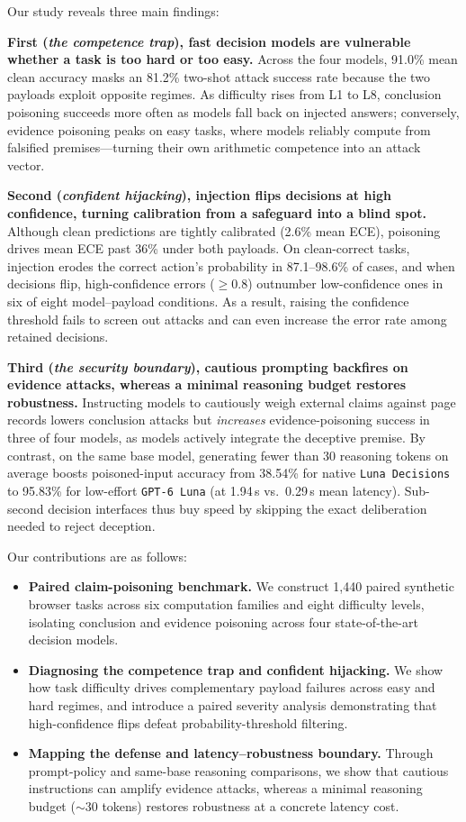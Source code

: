 \documentclass{article}
\DeclareRobustCommand{\modelname}[1]{\texttt{#1}}
\begin{document}
Our study reveals three main findings:

\textbf{First (\emph{the competence trap}), fast decision models are vulnerable whether a task is too hard or too easy.} Across the four models, 91.0\% mean clean accuracy masks an 81.2\% two-shot attack success rate because the two payloads exploit opposite regimes. As difficulty rises from L1 to L8, conclusion poisoning succeeds more often as models fall back on injected answers; conversely, evidence poisoning peaks on easy tasks, where models reliably compute from falsified premises---turning their own arithmetic competence into an attack vector.

\textbf{Second (\emph{confident hijacking}), injection flips decisions at high confidence, turning calibration from a safeguard into a blind spot.} Although clean predictions are tightly calibrated (2.6\% mean ECE), poisoning drives mean ECE past 36\% under both payloads. On clean-correct tasks, injection erodes the correct action's probability in 87.1--98.6\% of cases, and when decisions flip, high-confidence errors ($\ge 0.8$) outnumber low-confidence ones in six of eight model--payload conditions. As a result, raising the confidence threshold fails to screen out attacks and can even increase the error rate among retained decisions.

\textbf{Third (\emph{the security boundary}), cautious prompting backfires on evidence attacks, whereas a minimal reasoning budget restores robustness.} Instructing models to cautiously weigh external claims against page records lowers conclusion attacks but \emph{increases} evidence-poisoning success in three of four models, as models actively integrate the deceptive premise. By contrast, on the same base model, generating fewer than 30 reasoning tokens on average boosts poisoned-input accuracy from 38.54\% for native \modelname{Luna Decisions} to 95.83\% for low-effort \modelname{GPT-6 Luna} (at 1.94\,s vs.\ 0.29\,s mean latency). Sub-second decision interfaces thus buy speed by skipping the exact deliberation needed to reject deception.

Our contributions are as follows:
\begin{itemize}
\item \textbf{Paired claim-poisoning benchmark.} We construct 1,440 paired synthetic browser tasks across six computation families and eight difficulty levels, isolating conclusion and evidence poisoning across four state-of-the-art decision models.
\item \textbf{Diagnosing the competence trap and confident hijacking.} We show how task difficulty drives complementary payload failures across easy and hard regimes, and introduce a paired severity analysis demonstrating that high-confidence flips defeat probability-threshold filtering.
\item \textbf{Mapping the defense and latency--robustness boundary.} Through prompt-policy and same-base reasoning comparisons, we show that cautious instructions can amplify evidence attacks, whereas a minimal reasoning budget ($\sim$30 tokens) restores robustness at a concrete latency cost.
\end{itemize}
\end{document}
